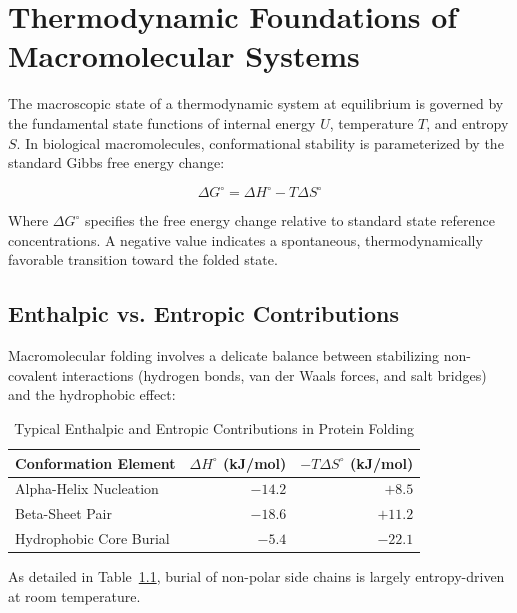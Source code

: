 \chapter{Thermodynamic Foundations of Macromolecular Systems}
\label{ch:thermodynamics}

The macroscopic state of a thermodynamic system at equilibrium is governed by the fundamental state functions of internal energy $U$, temperature $T$, and entropy $S$. In biological macromolecules, conformational stability is parameterized by the standard Gibbs free energy change:

\begin{equation}
  \Delta G^\circ = \Delta H^\circ - T \Delta S^\circ
  \label{eq:gibbs}
\end{equation}

Where $\Delta G^\circ$ specifies the free energy change relative to standard state reference concentrations. A negative value indicates a spontaneous, thermodynamically favorable transition toward the folded state.

\section{Enthalpic vs. Entropic Contributions}
Macromolecular folding involves a delicate balance between stabilizing non-covalent interactions (hydrogen bonds, van der Waals forces, and salt bridges) and the hydrophobic effect:

\begin{table}[htbp]
  \centering
  \caption{Typical Enthalpic and Entropic Contributions in Protein Folding}
  \label{tab:thermo_values}
  \begin{tabular}{lrr}
    \toprule
    Conformation Element & $\Delta H^\circ$ (kJ/mol) & $-T\Delta S^\circ$ (kJ/mol) \\
    \midrule
    Alpha-Helix Nucleation & $-14.2$ & $+8.5$ \\
    Beta-Sheet Pair & $-18.6$ & $+11.2$ \\
    Hydrophobic Core Burial & $-5.4$ & $-22.1$ \\
    \bottomrule
  \end{tabular}
\end{table}

As detailed in Table~\ref{tab:thermo_values}, burial of non-polar side chains is largely entropy-driven at room temperature.
